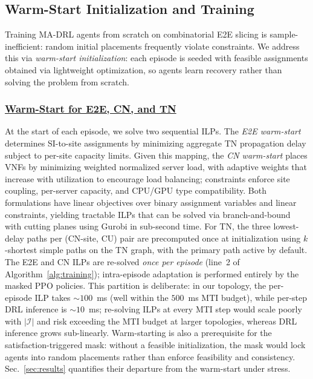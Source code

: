 \documentclass[12pt,lettersize,journal,onecolumn]{IEEEtran}
\begin{document}
\subsection{Warm-Start Initialization and Training} \label{subsec:training}
Training MA-DRL agents from scratch on combinatorial E2E slicing is sample-inefficient: random initial placements frequently violate constraints. We address this via \textit{warm-start initialization}: each episode is seeded with feasible assignments obtained via lightweight optimization, so agents learn recovery rather than solving the problem from scratch. %

\subsubsection{\underline{Warm-Start for E2E, CN, and TN}}
At the start of each episode, we solve two sequential ILPs. The \textit{E2E warm-start} determines SI-to-site assignments by minimizing aggregate TN propagation delay subject to per-site capacity limits. Given this mapping, the \textit{CN warm-start} places VNFs by minimizing weighted normalized server load, with adaptive weights that increase with utilization to encourage load balancing; constraints enforce site coupling, per-server capacity, and CPU/GPU type compatibility. Both formulations have linear objectives over binary assignment variables and linear constraints, yielding tractable ILPs that can be solved via branch-and-bound with cutting planes using Gurobi in sub-second time. For TN, the three lowest-delay paths per (CN-site, CU) pair are precomputed once at initialization using $k$-shortest simple paths on the TN graph, with the primary path active by default. The E2E and CN ILPs are re-solved \emph{once per episode} (line~2 of Algorithm~\ref{alg:training}); intra-episode adaptation is performed entirely by the masked PPO policies. This partition is deliberate: in our topology, the per-episode ILP takes ${\sim}100$~ms (well within the $500$~ms MTI budget), while per-step DRL inference is ${\sim}10$~ms; re-solving ILPs at every MTI step would scale poorly with $|\mathcal{I}|$ and risk exceeding the MTI budget at larger topologies, whereas DRL inference grows sub-linearly. Warm-starting is also a prerequisite for the satisfaction-triggered mask: without a feasible initialization, the mask would lock agents into random placements rather than enforce feasibility and consistency. Sec.~\ref{sec:results} quantifies their departure from the warm-start under stress.
\end{document}
